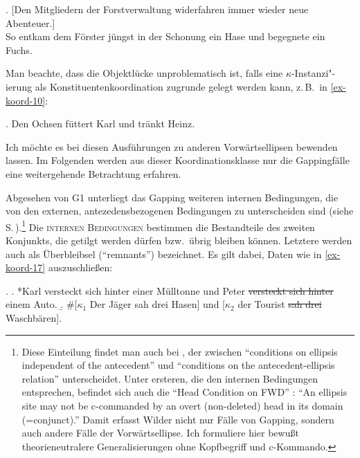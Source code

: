 \ex. \label{ex-koord-9}[Den Mitgliedern der Forstverwaltung widerfahren immer wieder neue Abenteuer.] \\
So entkam dem Förster jüngst in der Schonung ein Hase und begegnete ein Fuchs. \hfill
\citep[(44)]{Fortmann:05}

Man beachte, dass die Objektlücke unproblematisch ist, falls eine $\kappa$-Instanzi"-ierung als Konstituentenkoordination zugrunde gelegt werden kann, z.\,B.\  in \ref{ex-koord-10}:

\ex. \label{ex-koord-10}Den Ochsen füttert Karl und tränkt Heinz. \hfill \citep[(29a)]{Hoehle:83b} 

Ich möchte es bei diesen Ausführungen zu anderen Vorwärtsellipsen bewenden lassen. Im Folgenden werden aus dieser Koordinationsklasse nur die Gappingfälle eine weitergehende Betrachtung erfahren.


Abgesehen von G1 unterliegt das Gapping weiteren internen Bedingungen, die von den externen, antezedensbezogenen Bedingungen zu unterscheiden sind (siehe S.\,\pageref{sec-ext-bedingungen}).\footnote{Diese Einteilung findet man auch bei \citet[(40)]{Wilder:97}, der zwischen "`conditions on ellipsis independent of the antecedent"' und "`conditions on the antecedent-ellipsis relation"' unterscheidet. Unter ersteren, die den internen Bedingungen entsprechen, befindet sich auch die "`Head Condition on FWD"' \citep[(54)]{Wilder:97}: "`An ellipsis site may not be c-commanded by an overt (non-deleted) head in its domain (=conjunct)."' Damit erfasst Wilder nicht nur Fälle von Gapping, sondern auch andere Fälle der Vorwärtsellipse. Ich formuliere hier bewu\ss t theorieneutralere Generalisierungen ohne Kopfbegriff und c-Kommando.} Die \textsc{internen Bedingungen} bestimmen die Bestandteile des zweiten Konjunkts, die getilgt werden dürfen bzw.\ übrig bleiben können. Letztere werden auch als Überbleibsel ("`remnants"') bezeichnet. Es gilt dabei, Daten wie in \ref{ex-koord-17} auszuschlie\ss en:   

\ex. \label{ex-koord-17}
\a. *Karl versteckt sich hinter einer Mülltonne und Peter \sout{versteckt sich hinter} einem Auto. \hfill \citep[148]{Hartmann:00}\label{ex-koord-17-a}
\b. \#[$\kappa_1$ Der Jäger sah drei Hasen] und [$\kappa_2$ der Tourist \sout{sah drei} Waschbären].\label{ex-koord-17-b}

